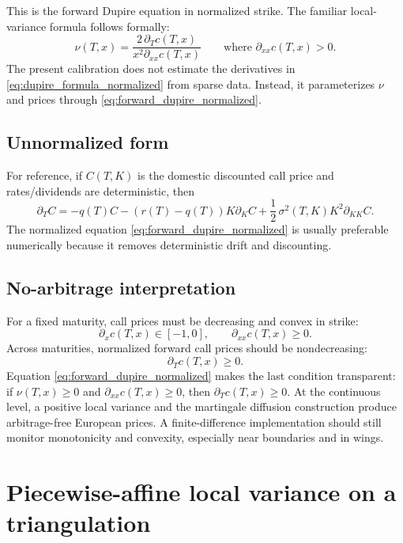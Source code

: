 \documentclass[11pt]{article}
\newcommand{\1}{\mathbf{1}}
\newcommand{\vloc}{\nu}
\begin{document}
This is the forward Dupire equation in normalized strike. The familiar local-variance
formula follows formally:
\begin{equation}
  \vloc(T,x)=\frac{2\,\partial_Tc(T,x)}{x^2\partial_{xx}c(T,x)}
  \qquad
  \text{where } \partial_{xx}c(T,x)>0.
  \label{eq:dupire_formula_normalized}
\end{equation}
The present calibration does not estimate the derivatives in
\eqref{eq:dupire_formula_normalized} from sparse data. Instead, it parameterizes
$\vloc$ and prices through \eqref{eq:forward_dupire_normalized}.

\subsection{Unnormalized form}

For reference, if $C(T,K)$ is the domestic discounted call price and rates/dividends are
deterministic, then
\begin{equation}
  \partial_T C
  =-q(T)C-(r(T)-q(T))K\partial_K C
    +\frac12\,\sigma^2(T,K)K^2\partial_{KK}C.
  \label{eq:dupire_unnormalized}
\end{equation}
The normalized equation \eqref{eq:forward_dupire_normalized} is usually preferable
numerically because it removes deterministic drift and discounting.

\subsection{No-arbitrage interpretation}

For a fixed maturity, call prices must be decreasing and convex in strike:
\[
  \partial_x c(T,x)\in[-1,0],
  \qquad
  \partial_{xx}c(T,x)\ge 0.
\]
Across maturities, normalized forward call prices should be nondecreasing:
\[
  \partial_T c(T,x)\ge 0.
\]
Equation \eqref{eq:forward_dupire_normalized} makes the last condition transparent:
if $\vloc(T,x)\ge0$ and $\partial_{xx}c(T,x)\ge0$, then $\partial_Tc(T,x)\ge0$.
At the continuous level, a positive local variance and the martingale diffusion
construction produce arbitrage-free European prices. A finite-difference implementation
should still monitor monotonicity and convexity, especially near boundaries and in wings.

\section{Piecewise-affine local variance on a triangulation}
\end{document}
